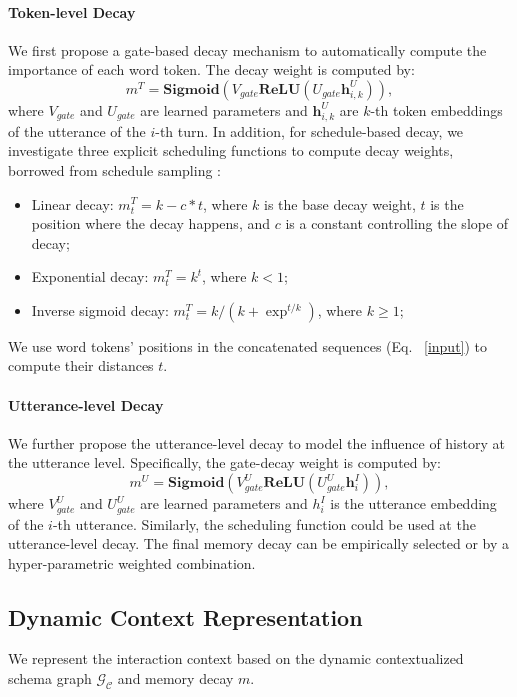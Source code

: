 \documentclass[letterpaper]{article} \usepackage{aaai21}  \usepackage{times}  \usepackage{helvet} \usepackage{courier}  \usepackage[hyphens]{url}  \usepackage{graphicx} \urlstyle{rm} \def\UrlFont{\rm}  \usepackage{natbib}  \usepackage{caption} \frenchspacing  \setlength{\pdfpagewidth}{8.5in}  \setlength{\pdfpageheight}{11in}
\begin{document}
\paragraph{Token-level Decay}
We first propose a gate-based decay mechanism to automatically compute the importance of each word token.
The decay weight is computed by:
\begin{equation}
m^T = \mathbf{Sigmoid} (V_{gate} \mathbf{ReLU} (U_{gate} \mathbf{h}^{U}_{i,k})),
\end{equation}
where {$V_{gate}$ and $U_{gate}$} are learned parameters and $\mathbf{h}^U_{i,k}$ are $k$-th token embeddings of the utterance of the $i$-th turn. 
In addition, for schedule-based decay, we investigate three explicit scheduling functions to compute decay weights, borrowed from schedule sampling \cite{bengio2015scheduled}:
\begin{itemize}
    \item Linear decay: $m_t^T = k - c * t$, where $k$ is the base decay weight, $t$ is the position where the decay happens, and $c$ is a constant controlling the slope of decay;
    \item Exponential decay: $m_t^T = k^t$, where $k < 1$;
    \item Inverse sigmoid decay: $m_t^T=  k / (k + \exp^{t / k})$, where $k\geq 1$;
\end{itemize}
We use word tokens' positions in the concatenated sequences (Eq. ~\ref{input}) to compute their distances $t$. 

\paragraph{Utterance-level Decay}
We further propose the utterance-level decay to model the influence of history at the utterance level. Specifically, the gate-decay weight is computed by:
\begin{equation}
m^U = \mathbf{Sigmoid} (V_{gate}^U \mathbf{ReLU} (U_{gate}^U \mathbf{h}^I_i)),
\end{equation}
where $V_{gate}^U$ and $U_{gate}^U$ are learned parameters and $h_i^I$ is the utterance embedding of the $i$-th utterance.  
Similarly, the scheduling function could be used at the utterance-level decay. 
The final memory decay can be empirically selected or by a hyper-parametric weighted combination.

\subsection{Dynamic Context Representation}
\label{representation}
We represent the interaction context based on the dynamic contextualized schema graph $\mathcal{G}_\mathcal{C}$ and memory decay $m$. 
\end{document}
